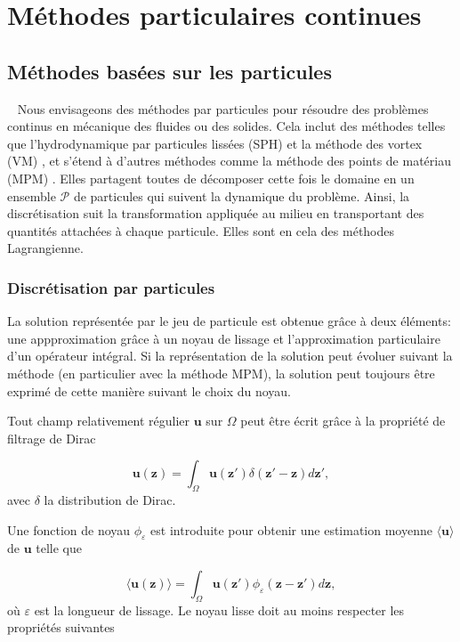 \section{Méthodes particulaires continues}
\subsection{Méthodes basées sur les particules}~\label{Background_Part}
Nous envisageons des méthodes par particules pour résoudre des problèmes continus en mécanique des fluides ou des solides. Cela inclut des méthodes telles que l'hydrodynamique par particules lissées (SPH) \cite{lucy_1977,gingold_monaghan_sph_1977} et la méthode des vortex (VM) \cite{cottet_vortex_2000}, et s'étend à d'autres méthodes comme la méthode des points de matériau (MPM) \cite{sulsky_particle_1994}. Elles partagent toutes de décomposer cette fois le domaine en un ensemble $\mathcal{P}$ de particules qui suivent la dynamique du problème. Ainsi, la discrétisation suit la transformation appliquée au milieu en transportant des quantités attachées à chaque particule. Elles sont en cela des méthodes Lagrangienne.

\subsubsection{Discrétisation par particules}

La solution représentée par le jeu de particule est obtenue grâce à deux éléments: une appproximation grâce à un noyau de lissage et l'approximation particulaire d'un opérateur intégral. Si la représentation de la solution peut évoluer suivant la méthode (en particulier avec la méthode MPM), la solution peut toujours être exprimé de cette manière suivant le choix du noyau.

Tout champ relativement régulier $\bm{u}$ sur $\Omega$ peut être écrit grâce à la propriété de filtrage de Dirac

\begin{equation*}
    \bm{u}(\bm{z}) = \int_{\Omega} \bm{u}(\bm{z'}) \delta(\bm{z'} - \bm{z})  d\bm{z'},
\end{equation*}avec $\delta$ la distribution de Dirac.

Une fonction de noyau $\phi_\varepsilon$ est introduite pour obtenir une estimation moyenne $\langle \bm{u} \rangle$ de $\bm{u}$ telle que

\begin{equation*}
    \langle \bm{u}(\bm{z}) \rangle = \int_{\Omega} \bm{u}(\bm{z'}) \phi_\varepsilon(\bm{z}-\bm{z'}) d\bm{z},
\end{equation*}où $\varepsilon$ est la longueur de lissage. Le noyau lisse doit au moins respecter les propriétés suivantes

